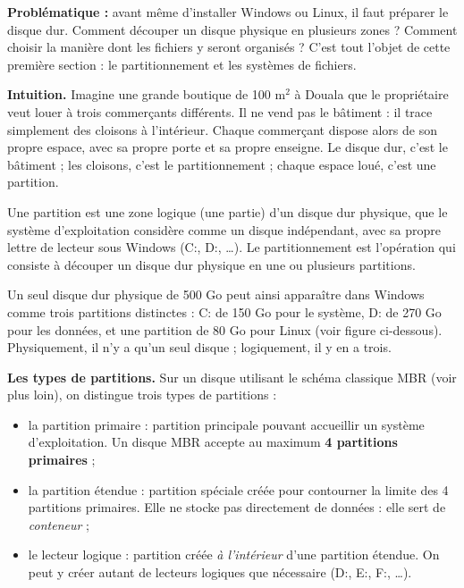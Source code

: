 \documentclass[11pt]{article}
\newcommand{\cle}[1]{{\popxbold\color{popdark}#1}}
\newcounter{popsec}
\newcounter{popsub}
\newcommand{\courssub}[1]{%
  \stepcounter{popsub}%
  \par\vspace{9pt}\noindent{\popxbold\fontsize{11.5}{13}\selectfont\color{popink}{\color{poporange}\thepopsec.\thepopsub}\hspace{6pt}#1}\par\nopagebreak\vspace{4pt}
}
\begin{document}
\textbf{Problématique :} avant même d'installer Windows ou Linux, il faut préparer le disque dur. Comment découper un disque physique en plusieurs zones ? Comment choisir la manière dont les fichiers y seront organisés ? C'est tout l'objet de cette première section : le \cle{partitionnement} et les \cle{systèmes de fichiers}.

\courssub{Le partitionnement d'un disque dur}

\textbf{Intuition.} Imagine une grande boutique de 100 m$^2$ à Douala que le propriétaire veut louer à trois commerçants différents. Il ne vend pas le bâtiment : il trace simplement des cloisons à l'intérieur. Chaque commerçant dispose alors de son propre espace, avec sa propre porte et sa propre enseigne. Le disque dur, c'est le bâtiment ; les cloisons, c'est le partitionnement ; chaque espace loué, c'est une partition.

\begin{definition}
Une \cle{partition} est une zone logique (une partie) d'un disque dur physique, que le système d'exploitation considère comme un disque indépendant, avec sa propre lettre de lecteur sous Windows (C:, D:, \ldots). Le \cle{partitionnement} est l'opération qui consiste à découper un disque dur physique en une ou plusieurs partitions.
\end{definition}

Un seul disque dur physique de 500 Go peut ainsi apparaître dans Windows comme trois partitions distinctes : C: de 150 Go pour le système, D: de 270 Go pour les données, et une partition de 80 Go pour Linux (voir figure ci-dessous). Physiquement, il n'y a qu'un seul disque ; logiquement, il y en a trois.

\textbf{Les types de partitions.} Sur un disque utilisant le schéma classique MBR (voir plus loin), on distingue trois types de partitions :

\begin{itemize}
\item la \cle{partition primaire} : partition principale pouvant accueillir un système d'exploitation. Un disque MBR accepte au maximum \textbf{4 partitions primaires} ;
\item la \cle{partition étendue} : partition spéciale créée pour contourner la limite des 4 partitions primaires. Elle ne stocke pas directement de données : elle sert de \emph{conteneur} ;
\item le \cle{lecteur logique} : partition créée \emph{à l'intérieur} d'une partition étendue. On peut y créer autant de lecteurs logiques que nécessaire (D:, E:, F:, \ldots).
\end{itemize}
\end{document}
